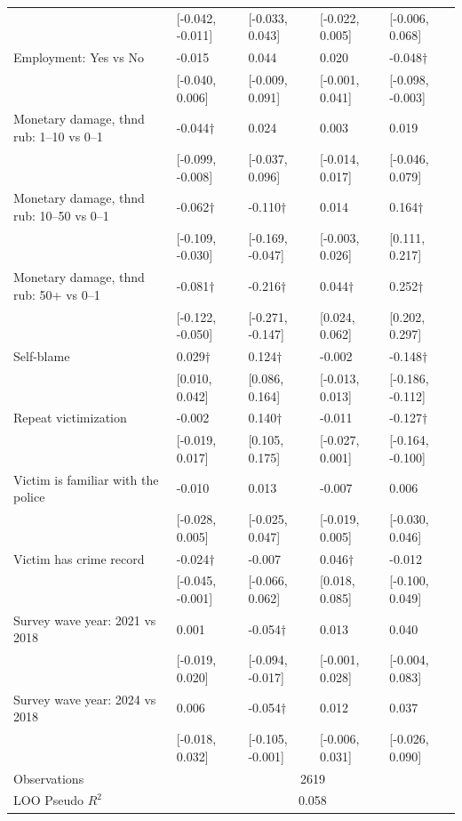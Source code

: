 \begin{tabular}[t]{lllll}
 & {}[-0.042, -0.011] & {}[-0.033, 0.043] & {}[-0.022, 0.005] & {}[-0.006, 0.068]\\
Employment: Yes vs No & -0.015 & 0.044 & 0.020 & -0.048$\dagger$\\
 & {}[-0.040, 0.006] & {}[-0.009, 0.091] & {}[-0.001, 0.041] & {}[-0.098, -0.003]\\
Monetary damage, thnd rub:  1–10 vs 0–1 & -0.044$\dagger$ & 0.024 & 0.003 & 0.019\\
 & {}[-0.099, -0.008] & {}[-0.037, 0.096] & {}[-0.014, 0.017] & {}[-0.046, 0.079]\\
Monetary damage, thnd rub:  10–50 vs 0–1 & -0.062$\dagger$ & -0.110$\dagger$ & 0.014 & 0.164$\dagger$\\
 & {}[-0.109, -0.030] & {}[-0.169, -0.047] & {}[-0.003, 0.026] & {}[0.111, 0.217]\\
Monetary damage, thnd rub:  50+ vs 0–1 & -0.081$\dagger$ & -0.216$\dagger$ & 0.044$\dagger$ & 0.252$\dagger$\\
 & {}[-0.122, -0.050] & {}[-0.271, -0.147] & {}[0.024, 0.062] & {}[0.202, 0.297]\\
Self-blame & 0.029$\dagger$ & 0.124$\dagger$ & -0.002 & -0.148$\dagger$\\
 & {}[0.010, 0.042] & {}[0.086, 0.164] & {}[-0.013, 0.013] & {}[-0.186, -0.112]\\
Repeat victimization & -0.002 & 0.140$\dagger$ & -0.011 & -0.127$\dagger$\\
 & {}[-0.019, 0.017] & {}[0.105, 0.175] & {}[-0.027, 0.001] & {}[-0.164, -0.100]\\
Victim is familiar with the police & -0.010 & 0.013 & -0.007 & 0.006\\
 & {}[-0.028, 0.005] & {}[-0.025, 0.047] & {}[-0.019, 0.005] & {}[-0.030, 0.046]\\
Victim has crime record & -0.024$\dagger$ & -0.007 & 0.046$\dagger$ & -0.012\\
 & {}[-0.045, -0.001] & {}[-0.066, 0.062] & {}[0.018, 0.085] & {}[-0.100, 0.049]\\
Survey wave year: 2021 vs 2018 & 0.001 & -0.054$\dagger$ & 0.013 & 0.040\\
 & {}[-0.019, 0.020] & {}[-0.094, -0.017] & {}[-0.001, 0.028] & {}[-0.004, 0.083]\\
Survey wave year: 2024 vs 2018 & 0.006 & -0.054$\dagger$ & 0.012 & 0.037\\
 & {}[-0.018, 0.032] & {}[-0.105, -0.001] & {}[-0.006, 0.031] & {}[-0.026, 0.090]\\
\midrule
Observations & \multicolumn{4}{c}{2619} &  &  & \\
LOO Pseudo $R^2$ & \multicolumn{4}{c}{0.058} &  &  & \\
\bottomrule
\end{tabular}